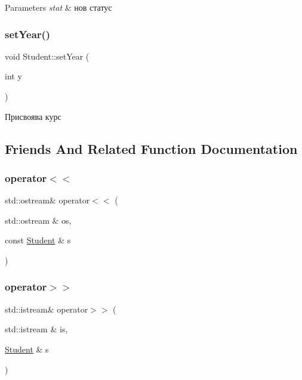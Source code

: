 \begin{DoxyParams}{Parameters}
{\em stat} & нов статус \\
\hline
\end{DoxyParams}
\mbox{\label{class_student_ac068619857e22e8a208c47314322cd11}} 
\subsubsection{\texorpdfstring{set\+Year()}{setYear()}}
{\footnotesize\ttfamily void Student\+::set\+Year (\begin{DoxyParamCaption}\item[{int}]{y }\end{DoxyParamCaption})}



Присвоява курс 



\subsection{Friends And Related Function Documentation}
\mbox{\label{class_student_a2f6afd7f32282f31d42e9ccf4340983d}} 
\subsubsection{\texorpdfstring{operator$<$$<$}{operator<<}}
{\footnotesize\ttfamily std\+::ostream\& operator$<$$<$ (\begin{DoxyParamCaption}\item[{std\+::ostream \&}]{os,  }\item[{const \hyperlink{class_student}{Student} \&}]{s }\end{DoxyParamCaption})\hspace{0.3cm}{\ttfamily [friend]}}

\mbox{\label{class_student_af7032f120efacd17a8c617ed189f1294}} 
\subsubsection{\texorpdfstring{operator$>$$>$}{operator>>}}
{\footnotesize\ttfamily std\+::istream\& operator$>$$>$ (\begin{DoxyParamCaption}\item[{std\+::istream \&}]{is,  }\item[{\hyperlink{class_student}{Student} \&}]{s }\end{DoxyParamCaption})\hspace{0.3cm}{\ttfamily [friend]}}



